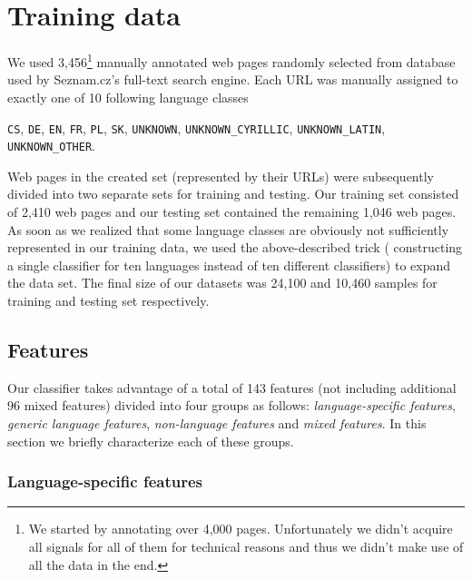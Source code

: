 \documentclass{acm_proc_article-sp}
\begin{document}
  \section{Training data}

  We used 3,456\footnote{We started by annotating over 4,000 pages.
  Unfortunately we didn't acquire all signals for all of them for technical reasons and thus
  we didn't make use of all the data in the end.} manually annotated 
  web pages randomly selected from database
  used by Seznam.cz's full-text search engine. Each URL was manually assigned
  to exactly one of 10 following language classes {\texttt{CS}, \texttt{DE},
  \texttt{EN}, \texttt{FR}, \texttt{PL}, \texttt{SK}, \texttt{UNKNOWN}, 
  \texttt{UNKNOWN\_CYRILLIC}, \texttt{UNKNOWN\_LATIN},
  \texttt{UNKNOWN\_OTHER}. 
  
  Web pages in the created set (represented by their
  URLs) were subsequently divided into two separate sets for training and
  testing. Our training set consisted of 2,410 web pages and our testing set
  contained the remaining 1,046 web pages. 
  As soon as we realized that some
  language classes are obviously not sufficiently represented in our training
  data, we used the above-described trick ( constructing a single classifier for
  ten languages instead of ten different classifiers) to expand the data set.
 The final size of our datasets was
  24,100 and 10,460 samples for training and testing set respectively.


  \subsection{Features}
  Our classifier takes advantage of a total of 143 features (not including additional 96 mixed features) divided into four groups
  as follows: \textit{language-specific features}, \textit{generic language features}, \textit{non-language
  features} and \textit{mixed features}. In this section we briefly characterize each of these
  groups.

\subsubsection{Language-specific features}

}
\end{document}
